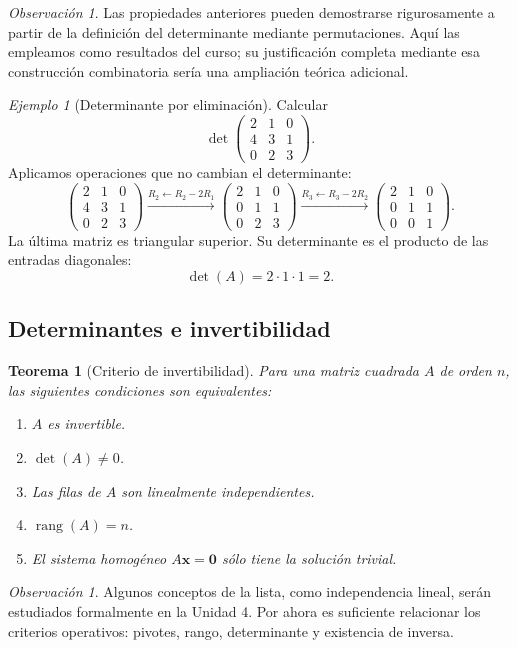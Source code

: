 \documentclass[12pt]{article}
\newtheorem{teorema}[definicion]{Teorema}
\theoremstyle{remark}
\newtheorem{observacion}[definicion]{Observación}
\newtheorem{ejemplo}[definicion]{Ejemplo}
\newcommand{\rang}{\operatorname{rang}}
\newcommand{\vect}[1]{\boldsymbol{#1}}
\begin{document}
\begin{observacion}
Las propiedades anteriores pueden demostrarse rigurosamente a partir de la definición del determinante mediante permutaciones. Aquí las empleamos como resultados del curso; su justificación completa mediante esa construcción combinatoria sería una ampliación teórica adicional.
\end{observacion}

\begin{ejemplo}[Determinante por eliminación]
Calcular
\[
\det\begin{pmatrix}2&1&0\\4&3&1\\0&2&3\end{pmatrix}.
\]
Aplicamos operaciones que no cambian el determinante:
\[
\begin{pmatrix}2&1&0\\4&3&1\\0&2&3\end{pmatrix}
\xrightarrow{R_2\leftarrow R_2-2R_1}
\begin{pmatrix}2&1&0\\0&1&1\\0&2&3\end{pmatrix}
\xrightarrow{R_3\leftarrow R_3-2R_2}
\begin{pmatrix}2&1&0\\0&1&1\\0&0&1\end{pmatrix}.
\]
La última matriz es triangular superior. Su determinante es el producto de las entradas diagonales:
\[
\boxed{\det(A)=2\cdot1\cdot1=2}.
\]
\end{ejemplo}

\subsection{Determinantes e invertibilidad}
\begin{teorema}[Criterio de invertibilidad]
Para una matriz cuadrada $A$ de orden $n$, las siguientes condiciones son equivalentes:
\begin{enumerate}
\item $A$ es invertible.
\item $\det(A)\ne0$.
\item Las filas de $A$ son linealmente independientes.
\item $\rang(A)=n$.
\item El sistema homogéneo $A\vect{x}=\vect{0}$ sólo tiene la solución trivial.
\end{enumerate}
\end{teorema}
\begin{observacion}
Algunos conceptos de la lista, como independencia lineal, serán estudiados formalmente en la Unidad 4. Por ahora es suficiente relacionar los criterios operativos: pivotes, rango, determinante y existencia de inversa.
\end{observacion}
\end{document}
